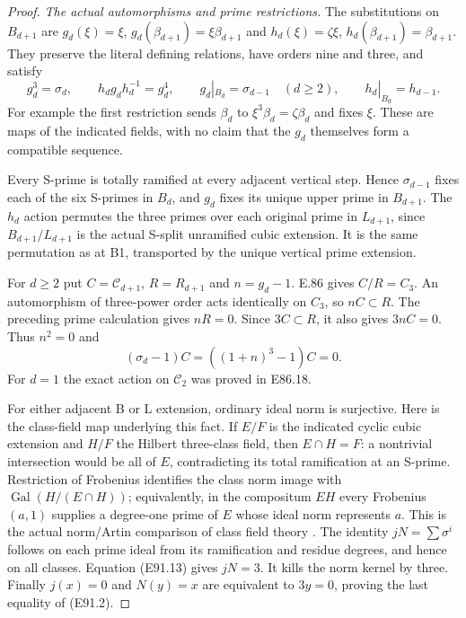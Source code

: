 \begin{proof}
\emph{The actual automorphisms and prime restrictions.}
The substitutions on $B_{d+1}$ are
$g_d(\xi)=\xi$, $g_d(\beta_{d+1})=\xi\beta_{d+1}$ and
$h_d(\xi)=\zeta\xi$, $h_d(\beta_{d+1})=\beta_{d+1}$.
They preserve the literal defining relations, have orders nine
and three, and satisfy
\[
 g_d^3=\sigma_d,\qquad
 h_dg_dh_d^{-1}=g_d^4,\qquad
 g_d|_{B_d}=\sigma_{d-1}\quad(d\ge2),\qquad
 h_d|_{B_d}=h_{d-1}.
 \tag{E91.12}
\]
For example the first restriction sends $\beta_d$ to
$\xi^3\beta_d=\zeta\beta_d$ and fixes $\xi$.
These are maps of the indicated fields, with no claim that the
$g_d$ themselves form a compatible sequence.

Every S-prime is totally ramified at every adjacent vertical
step. Hence $\sigma_{d-1}$ fixes each of the six S-primes in
$B_d$, and $g_d$ fixes its unique upper prime in $B_{d+1}$.
The $h_d$ action permutes the three primes over each original
prime in $L_{d+1}$, since $B_{d+1}/L_{d+1}$ is the actual
S-split unramified cubic extension. It is the same permutation
as at B1, transported by the unique vertical prime extension.

For $d\ge2$ put $C=\mathcal C_{d+1}$, $R=R_{d+1}$ and $n=g_d-1$.
E.86 gives $C/R=C_3$. An automorphism of three-power order
acts identically on $C_3$, so $nC\subset R$. The preceding
prime calculation gives $nR=0$. Since $3C\subset R$, it also
gives $3nC=0$. Thus $n^2=0$ and
\[
               (\sigma_d-1)C=((1+n)^3-1)C=0.
 \tag{E91.13}
\]
For $d=1$ the exact action on $\mathcal C_2$ was proved in E86.18.

For either adjacent B or L extension, ordinary ideal norm is
surjective. Here is the class-field map underlying this fact.
If $E/F$ is the indicated cyclic cubic extension and $H/F$
the Hilbert three-class field, then $E\cap H=F$: a nontrivial
intersection would be all of $E$, contradicting its total
ramification at an S-prime. Restriction of Frobenius identifies
the class norm image with
$\operatorname{Gal}(H/(E\cap H))$; equivalently, in the
compositum $EH$ every Frobenius $(a,1)$ supplies a degree-one
prime of $E$ whose ideal norm represents $a$.
This is the actual norm/Artin comparison of class field theory
\cite[V, Proposition3.3, Theorem3.6 and Example3.9;
VIII, Theorem7.4]{E_MilneCFT}.
The identity $jN=\sum\sigma^i$ follows on each prime ideal
from its ramification and residue degrees, and hence on all
classes. Equation (E91.13) gives $jN=3$. It kills the norm
kernel by three. Finally $j(x)=0$ and $N(y)=x$ are equivalent
to $3y=0$, proving the last equality of (E91.2).


\end{proof}
